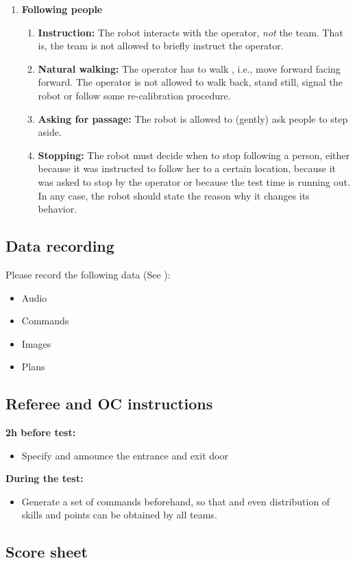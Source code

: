 \begin{enumerate}
\begin{enumerate}
	\end{enumerate}
	\item \textbf{Following people} 
	\begin{enumerate}
		\item \textbf{Instruction:} The robot interacts with the operator, \emph{not} the team. That is, the team is not allowed to briefly instruct the operator.
		\item \textbf{Natural walking:} The operator has to walk , i.e., move forward facing forward. The operator is not allowed to walk back, stand still, signal the robot or follow some re-calibration procedure.
		\item \textbf{Asking for passage:} The robot is allowed to (gently) ask people to step aside.
		\item \textbf{Stopping:} The robot must decide when to stop following a person, either because it was instructed to follow her to a certain location, because it was asked to stop by the operator or because the test time is running out. In any case, the robot should state the reason why it changes its behavior.
	\end{enumerate}
\end{enumerate}

\subsection{Data recording}
  Please record the following data (See ):
  \begin{itemize}
   \item Audio
   \item Commands
   \item Images
   \item Plans
  \end{itemize}


\subsection{Referee and OC instructions}
\textbf{2h before test:}
\begin{itemize}
\item Specify and announce the entrance and exit door
\end{itemize}
\textbf{During the test:}
\begin{itemize}
\item Generate a set of commands beforehand, so that and even distribution of skills and points can be obtained by all teams. 
\end{itemize}

\newpage
\subsection{Score sheet}


